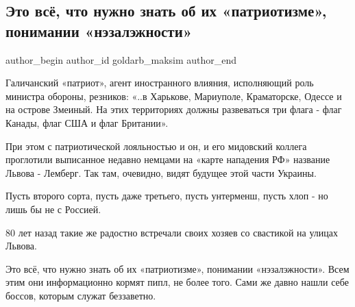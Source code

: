  
 
 
 
 
 
\subsection{Это всё, что нужно знать об их «патриотизме», понимании «нэзалэжности»}
\label{sec:06_12_2021.fb.goldarb_maksim.1.patriotizm_reznikov}
 
\ifcmt
 author_begin
   author_id goldarb_maksim
 author_end
\fi

Галичанский «патриот», агент иностранного влияния, исполняющий роль министра
обороны, резников:  «..в Харькове, Мариуполе, Краматорске, Одессе и на острове
Змеиный. На этих территориях должны развеваться три флага - флаг Канады, флаг
США и флаг Британии». 

При этом с патриотической лояльностью и он, и его мидовский коллега проглотили
выписанное недавно немцами на «карте нападения РФ» название Львова - Лемберг.
Так там, очевидно, видят будущее этой части Украины. 

Пусть второго сорта, пусть даже третьего, пусть унтерменш, пусть хлоп - но лишь
бы не с Россией. 

80 лет назад такие же радостно встречали своих хозяев со свастикой на улицах
Львова. 

Это всё, что нужно знать об их «патриотизме», понимании «нэзалэжности». Всем
этим они информационно кормят пипл, не более того. Сами же давно нашли себе
боссов, которым служат беззаветно.

